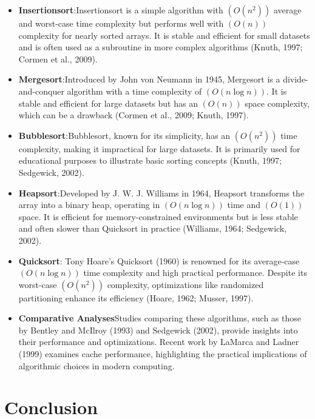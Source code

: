 \documentclass[sigplan,screen]{acmart}
\begin{document}
\begin{itemize}
  \item \textbf{Insertionsort}:Insertionsort is a simple algorithm with 
  $(O(n^2))$ average and worst-case time complexity but performs 
  well with $(O(n))$ complexity for nearly sorted arrays. It is stable and efficient 
  for small datasets and is often used as a subroutine in more complex 
  algorithms (Knuth, 1997; Cormen et al., 2009).
  \item \textbf{Mergesort}:Introduced by John von Neumann in 1945, 
  Mergesort is a divide-and-conquer algorithm with a time complexity of $(O(n \log n))$. 
  It is stable and efficient for large datasets but has an $(O(n))$ space complexity, 
  which can be a drawback (Cormen et al., 2009; Knuth, 1997).
  \item \textbf{Bubblesort}:Bubblesort, known for its simplicity, 
  has an $(O(n^2))$ time complexity, making it impractical for 
  large datasets. It is primarily used for educational purposes 
  to illustrate basic sorting concepts (Knuth, 1997; Sedgewick, 2002).
  \item \textbf{ Heapsort}:Developed by J. W. J. Williams in 1964, Heapsort transforms 
  the array into a binary heap, operating in $(O(n \log n))$ time and $(O(1))$ space. 
  It is efficient for memory-constrained environments but is less stable and often slower 
  than Quicksort in practice (Williams, 1964; Sedgewick, 2002).
  \item \textbf{Quicksort}: Tony Hoare's Quicksort (1960) is renowned for its 
  average-case $(O(n \log n))$ time complexity and high practical performance. 
  Despite its worst-case $(O(n^2))$ complexity, optimizations like 
  randomized partitioning enhance its efficiency (Hoare, 1962; Musser, 1997).
  \item \textbf{Comparative Analyses}Studies comparing these algorithms, 
  such as those by Bentley and McIlroy (1993) and Sedgewick (2002), 
  provide insights into their performance and optimizations. 
  Recent work by LaMarca and Ladner (1999) examines cache performance, 
  highlighting the practical implications of algorithmic choices in modern computing.
\end{itemize}



\section{Conclusion}
\end{document}
